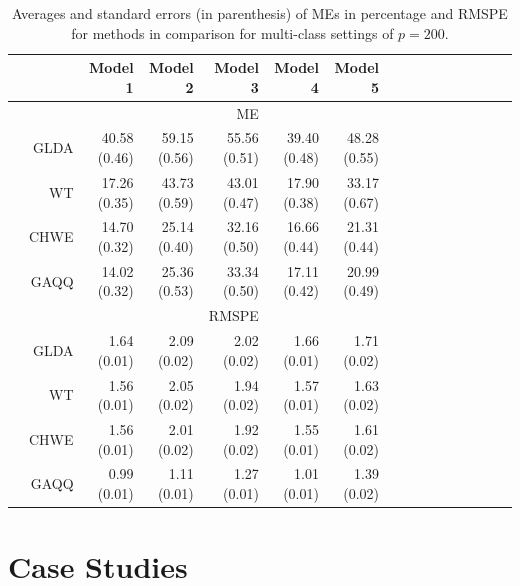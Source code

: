 \documentclass[12pt]{article}
\begin{document}
\begin{table}[h]
\small
\begin{center}
\caption{Averages and standard errors (in parenthesis) of MEs in percentage and RMSPE for methods in comparison for multi-class settings of $p = 200$.}
\label{table:multi}
\begin{tabular}{rrrrrrrrrrrrrrrr}
\hline \hline
&&Model 1 &Model 2  &Model 3  &Model 4  &Model 5   \\
\hline
&&&& ME    \\ \hline
&GLDA   &40.58 (0.46) &59.15 (0.56) &55.56 (0.51) &39.40 (0.48) &48.28 (0.55) \\
&WT     &17.26 (0.35) &43.73 (0.59) &43.01 (0.47) &17.90 (0.38) &33.17 (0.67)  \\
&CHWE   &14.70 (0.32) &25.14 (0.40) &32.16 (0.50) &16.66 (0.44) &21.31 (0.44)  \\
&GAQQ   &14.02 (0.32) &25.36 (0.53) &33.34 (0.50) &17.11 (0.42) &20.99 (0.49)  \\
\hline
&&&& RMSPE     \\
\hline
&GLDA   &1.64 (0.01)  &2.09 (0.02)  &2.02 (0.02)  &1.66 (0.01) &1.71 (0.02) \\
&WT     &1.56 (0.01)  &2.05 (0.02)  &1.94 (0.02)  &1.57 (0.01) &1.63 (0.02)  \\
&CHWE   &1.56 (0.01)  &2.01 (0.02)  &1.92 (0.02)  &1.55 (0.01) &1.61 (0.02)  \\
&GAQQ   &0.99 (0.01)  &1.11 (0.01)  &1.27 (0.01)  &1.01 (0.01) &1.39 (0.02)  \\
\hline \hline
\end{tabular}
\end{center}
\end{table}

\section{Case Studies}\label{sec:realdata}
%
%
\end{document}
